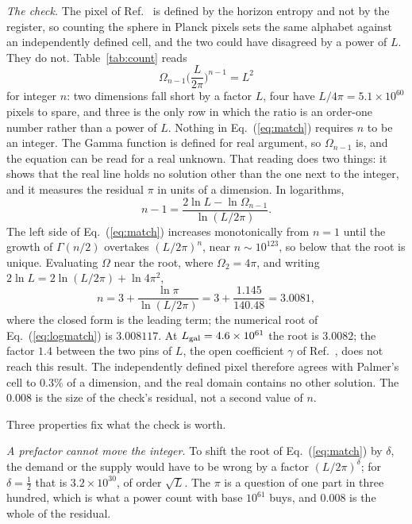 \documentclass[aps,prd,twocolumn,superscriptaddress,nofootinbib]{revtex4-2}
\begin{document}
\textit{The check.} The pixel of Ref.~\cite{korytko2026} is defined by the horizon entropy and not by the register, so counting the sphere in Planck pixels sets the same alphabet against an independently defined cell, and the two could have disagreed by a power of $L$. They do not. Table~\ref{tab:count} reads
\begin{equation}
\Omega_{n-1}\Big(\frac{L}{2\pi}\Big)^{n-1} = L^2
\label{eq:match}
\end{equation}
for integer $n$: two dimensions fall short by a factor $L$, four have $L/4\pi = 5.1\times10^{60}$ pixels to spare, and three is the only row in which the ratio is an order-one number rather than a power of $L$. Nothing in Eq.~(\ref{eq:match}) requires $n$ to be an integer. The Gamma function is defined for real argument, so $\Omega_{n-1}$ is, and the equation can be read for a real unknown. That reading does two things: it shows that the real line holds no solution other than the one next to the integer, and it measures the residual $\pi$ in units of a dimension. In logarithms,
\begin{equation}
n - 1 = \frac{2\ln L - \ln\Omega_{n-1}}{\ln(L/2\pi)} .
\label{eq:logmatch}
\end{equation}
The left side of Eq.~(\ref{eq:match}) increases monotonically from $n = 1$ until the growth of $\Gamma(n/2)$ overtakes $(L/2\pi)^{n}$, near $n \sim 10^{123}$, so below that the root is unique. Evaluating $\Omega$ near the root, where $\Omega_2 = 4\pi$, and writing $2\ln L = 2\ln(L/2\pi) + \ln 4\pi^2$,
\begin{equation}
n = 3 + \frac{\ln\pi}{\ln(L/2\pi)} = 3 + \frac{1.145}{140.48} = 3.0081 ,
\label{eq:root}
\end{equation}
where the closed form is the leading term; the numerical root of Eq.~(\ref{eq:logmatch}) is $3.008117$. At $L_{\rm gal} = 4.6\times10^{61}$ the root is $3.0082$; the factor $1.4$ between the two pins of $L$, the open coefficient $\gamma$ of Ref.~\cite{korytko2026}, does not reach this result. The independently defined pixel therefore agrees with Palmer's cell to $0.3\%$ of a dimension, and the real domain contains no other solution. The $0.008$ is the size of the check's residual, not a second value of $n$.

Three properties fix what the check is worth.

\textit{A prefactor cannot move the integer.} To shift the root of Eq.~(\ref{eq:match}) by $\delta$, the demand or the supply would have to be wrong by a factor $(L/2\pi)^{\delta}$; for $\delta = \tfrac12$ that is $3.2\times10^{30}$, of order $\sqrt L$. The $\pi$ is a question of one part in three hundred, which is what a power count with base $10^{61}$ buys, and $0.008$ is the whole of the residual.
\end{document}
